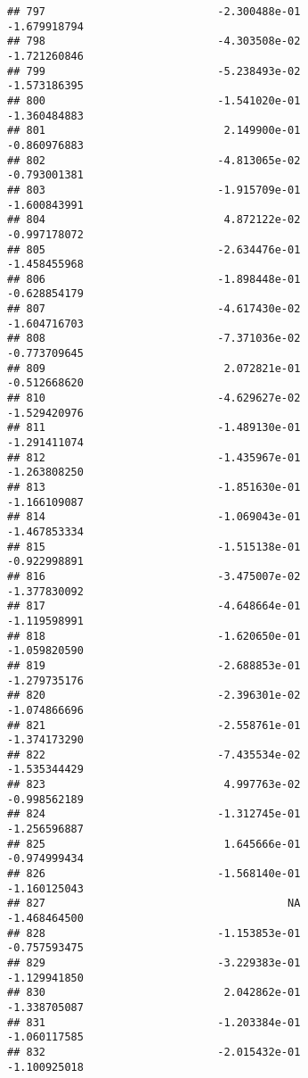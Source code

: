 \documentclass[
]{article}
\begin{document}
\begin{verbatim}
## 797                           -2.300488e-01               -1.679918794
## 798                           -4.303508e-02               -1.721260846
## 799                           -5.238493e-02               -1.573186395
## 800                           -1.541020e-01               -1.360484883
## 801                            2.149900e-01               -0.860976883
## 802                           -4.813065e-02               -0.793001381
## 803                           -1.915709e-01               -1.600843991
## 804                            4.872122e-02               -0.997178072
## 805                           -2.634476e-01               -1.458455968
## 806                           -1.898448e-01               -0.628854179
## 807                           -4.617430e-02               -1.604716703
## 808                           -7.371036e-02               -0.773709645
## 809                            2.072821e-01               -0.512668620
## 810                           -4.629627e-02               -1.529420976
## 811                           -1.489130e-01               -1.291411074
## 812                           -1.435967e-01               -1.263808250
## 813                           -1.851630e-01               -1.166109087
## 814                           -1.069043e-01               -1.467853334
## 815                           -1.515138e-01               -0.922998891
## 816                           -3.475007e-02               -1.377830092
## 817                           -4.648664e-01               -1.119598991
## 818                           -1.620650e-01               -1.059820590
## 819                           -2.688853e-01               -1.279735176
## 820                           -2.396301e-02               -1.074866696
## 821                           -2.558761e-01               -1.374173290
## 822                           -7.435534e-02               -1.535344429
## 823                            4.997763e-02               -0.998562189
## 824                           -1.312745e-01               -1.256596887
## 825                            1.645666e-01               -0.974999434
## 826                           -1.568140e-01               -1.160125043
## 827                                      NA               -1.468464500
## 828                           -1.153853e-01               -0.757593475
## 829                           -3.229383e-01               -1.129941850
## 830                            2.042862e-01               -1.338705087
## 831                           -1.203384e-01               -1.060117585
## 832                           -2.015432e-01               -1.100925018

\end{verbatim}
\end{document}
